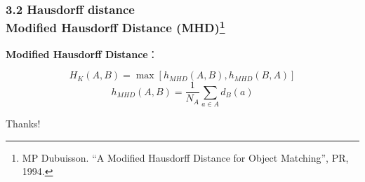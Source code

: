 \documentclass[notheorems,serif,table,compress]{beamer}  %
\begin{document}
\begin{frame}
\frametitle{3.2 Hausdorff distance \\ \normalsize{Modified Hausdorff Distance (MHD)\footnote{MP Dubuisson. ``A Modified Hausdorff Distance for Object Matching'', PR, 1994.}}}
{\color{blue}\textbf{Modified Hausdorff Distance}}：
\begin{tcolorbox}[colback=red!5,colframe=blue!75!black]
\begin{displaymath}
H_{K}(A,B)=\max[h_{MHD}(A,B),h_{MHD}(B,A)]
\end{displaymath}
\begin{displaymath}
h_{MHD}(A,B)=\frac{1}{N_{A}}\sum_{a\in A} d_{B}(a)
\end{displaymath}
\end{tcolorbox}
\end{frame} 

\begin{frame}
  \vspace{2cm}
  \centering
  \color{blue}\Huge{Thanks!}
  \vspace{1.5cm}
 

\end{frame}
\end{document}
